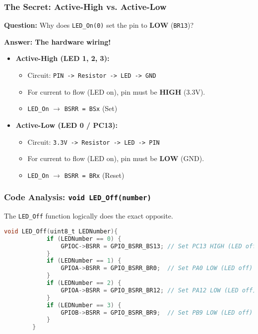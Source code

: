 \documentclass{beamer}
\begin{document}
\begin{frame}
	\frametitle{The Secret: Active-High vs. Active-Low}
	\textbf{Question:} Why does \texttt{LED\_On(0)} set the pin to \textbf{LOW} (\texttt{BR13})?
	
	\medskip
	\textbf{Answer: The hardware wiring!}
	\begin{itemize}
		\item \textbf{Active-High (LED 1, 2, 3):}
		\begin{itemize}
			\item Circuit: \texttt{PIN -> Resistor -> LED -> GND}
			\item For current to flow (LED on), pin must be \textbf{HIGH} (3.3V).
			\item \texttt{LED\_On} $\rightarrow$ \texttt{BSRR = BSx} (Set)
		\end{itemize}
		\medskip
		\item \textbf{Active-Low (LED 0 / PC13):}
		\begin{itemize}
			\item Circuit: \texttt{3.3V -> Resistor -> LED -> PIN}
			\item For current to flow (LED on), pin must be \textbf{LOW} (GND).
			\item \texttt{LED\_On} $\rightarrow$ \texttt{BSRR = BRx} (Reset)
		\end{itemize}
	\end{itemize}
\end{frame}

\begin{frame}[fragile]
	\frametitle{Code Analysis: \texttt{void LED\_Off(number)}}
	The \texttt{LED\_Off} function logically does the exact opposite.
	
	\begin{lstlisting}[language=C, style=mystyle, basicstyle=\scriptsize]
		void LED_Off(uint8_t LEDNumber){
			if (LEDNumber == 0) {
				GPIOC->BSRR = GPIO_BSRR_BS13; // Set PC13 HIGH (LED off)
			}
			if (LEDNumber == 1) {
				GPIOA->BSRR = GPIO_BSRR_BR0;  // Set PA0 LOW (LED off)
			}
			if (LEDNumber == 2) {
				GPIOA->BSRR = GPIO_BSRR_BR12; // Set PA12 LOW (LED off)
			}
			if (LEDNumber == 3) {
				GPIOB->BSRR = GPIO_BSRR_BR9;  // Set PB9 LOW (LED off)
			}
		}
	\end{lstlisting}
\end{frame}
\end{document}
